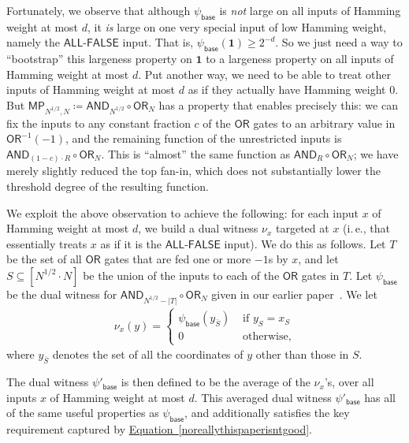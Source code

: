 \documentclass[11pt]{article}
\numberwithin{equation}{section}
\theoremstyle{definition}
\theoremstyle{plain}
\newcommand{\ie}{i.\,e.}
\newcommand{\expeqref}[2]{\hyperref[#2]{#1~\eqref{#2}}}
\newcommand{\OR}{\mathsf{ OR}}
\newcommand{\AND}{\mathsf{AND}}
\begin{document}
Fortunately, we observe that although $\psi_{\textsf{base}}$ is \emph{not} large on all inputs of Hamming weight at most $d$, it
\emph{is} large on one very special input of low Hamming weight, namely the $\textsf{ALL-FALSE}$ input. 
That is, $\psi_{\textsf{base}}(\mathbf{1}) \geq 2^{-d}$. 
So we just need a way to ``bootstrap'' this largeness property on $\mathbf{1}$ to 
a largeness property on all inputs of Hamming weight at most $d$.
Put another way, we need to be able to treat other inputs of Hamming weight at most $d$ as if they actually have Hamming weight 0.
But
$\mathsf{MP}_{N^{1/2}, N} \coloneqq  \AND_{N^{1/2}} \circ \OR_N$ has a property that enables precisely this: we can fix the inputs to any constant fraction $c$ of the $\OR$ gates to an arbitrary value in $\OR^{-1}(-1)$,
and the remaining function of the unrestricted inputs is $\AND_{(1-c) \cdot R} \circ \OR_N$. This  is ``almost'' the same
function as $\AND_R \circ \OR_N$; we have merely
slightly reduced the top fan-in, which does not substantially lower the threshold degree of the resulting function. 

We exploit the above observation
to achieve the following: for each input $x$ of Hamming weight at most $d$, we build a dual witness $\nu_x$
targeted at $x$ (\ie, that essentially treats $x$ as if it is the $\textsf{ALL-FALSE}$ input). We do this as follows. Let $T$ be the set of all $\OR$ gates
that are
fed one or more $-1$s by $x$, and let $S \subseteq [N^{1/2} \cdot N]$ be the union of the inputs
to each of the $\OR$ gates in $T$. Let $\psi_{\textsf{base}}$ be the dual witness for $\AND_{N^{1/2} - |T|} \circ \OR_N$ given in our
%
earlier paper~\cite{bt14}.  %
We let 
\begin{align*} \nu_x(y)=\begin{cases} \psi_{\textsf{base}}(y_{\bar{S}}) & \text{ if } y_{S} = x_S\\
0 & \text{ otherwise,} \end{cases}\end{align*} 
%
where $y_{\bar{S}}$ denotes the set of all the coordinates of $y$ other than those in $S$.

The dual witness $\psi'_{\textsf{base}}$ is then defined to be the average of the $\nu_x$'s, over all inputs $x$ of Hamming weight at most $d$. 
This averaged dual witness $\psi'_{\textsf{base}}$ has all of the same useful properties as $\psi_{\textsf{base}}$, and additionally satisfies the key requirement captured by \expeqref{Equation}{noreallythispaperisntgood}.
\end{document}
